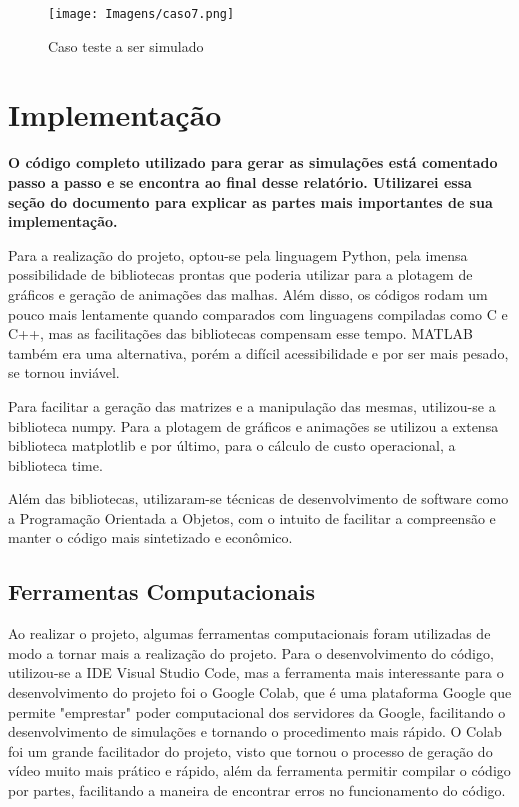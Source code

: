 \documentclass[article]{abntex2}
\begin{document}
\begin{figure}[H]
    \begin{center}
       
        \texttt{[image: Imagens/caso7.png]} 
        \caption{Caso teste a ser simulado}
    \end{center}
\end{figure}
\section{Implementação}
\textbf{O código completo utilizado para gerar as simulações está comentado passo a passo e se encontra ao final desse relatório. Utilizarei essa seção do documento para explicar as partes mais importantes de sua implementação.}

Para a realização do projeto, optou-se pela linguagem Python, pela imensa possibilidade de bibliotecas prontas que poderia utilizar para a plotagem de gráficos e geração de animações das malhas. Além disso, os códigos rodam um pouco mais lentamente quando comparados com linguagens compiladas como C e C++, mas as facilitações das bibliotecas compensam esse tempo. MATLAB também era uma alternativa, porém a difícil acessibilidade e por ser mais pesado, se tornou inviável.

Para facilitar a geração das matrizes e a manipulação das mesmas, utilizou-se a biblioteca numpy. Para a plotagem de gráficos e animações se utilizou a extensa biblioteca matplotlib e por último, para o cálculo de custo operacional, a biblioteca time.

Além das bibliotecas, utilizaram-se  técnicas de desenvolvimento de software como a Programação Orientada a Objetos, com o intuito de facilitar a compreensão e manter o código mais sintetizado e econômico. 

\subsection{Ferramentas Computacionais}
Ao realizar o projeto, algumas ferramentas computacionais foram utilizadas de modo a tornar mais a realização do projeto. Para o desenvolvimento do código, utilizou-se a IDE Visual Studio Code, mas a ferramenta mais interessante para o desenvolvimento do projeto foi o Google Colab, que é uma plataforma Google que permite "emprestar" poder computacional dos servidores da Google, facilitando o desenvolvimento de simulações e tornando o procedimento mais rápido. O Colab foi um grande facilitador do projeto, visto que tornou o processo de geração do vídeo muito mais prático e rápido, além da ferramenta permitir compilar o código por partes, facilitando a maneira de encontrar erros no funcionamento do código.
\end{document}
